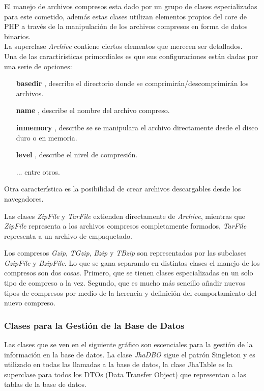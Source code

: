 El manejo de archivos compresos esta dado por un grupo de clases especializadas para este cometido, adem\'as estas clases utilizan elementos propios del core de PHP a trav\'es de la manipulaci\'on de los archivos compresos en forma de datos binarios.\\

La superclase \textit{Archive} contiene ciertos elementos que merecen ser detallados.\\

Una de las caractiristicas primordiales es que sus configuraciones est\'an dadas por una serie de opciones:
\begin{itemize}
	\item[\textbf{basedir}], describe el directorio donde se comprimir\'an/descomprimir\'an los archivos.
	\item[\textbf{name}], describe el nombre del archivo compreso.
	\item[\textbf{inmemory}], describe se se manipulara el archivo directamente desde el disco duro o en memoria.
	\item[\textbf{level}], describe el nivel de compresi\'on.
	\item[...] entre otros.
\end{itemize}



Otra caracter\'istica es la posibilidad de crear archivos descargables desde los navegadores.



Las clases \emph{ZipFile} y \emph{TarFile} extienden directamente de \emph{Archive}, mientras que \emph{ZipFile} representa a los archivos compresos completamente formados, \emph{TarFile} representa a un archivo de empaquetado.





Los compresos \emph{Gzip}, \emph{TGzip}, \emph{Bzip} y \emph{TBzip} son representados por las subclases \emph{GzipFile} y \emph{BzipFile}. Lo que se gana separando en distintas clases el manejo de los compresos son dos cosas. Primero, que se tienen clases especializadas en un solo tipo de compreso a la vez. Segundo, que es mucho m\'as sencillo a\~nadir nuevos tipos de compresos por medio de la herencia y definici\'on del comportamiento del nuevo compreso.

\subsubsection{Clases para la Gesti\'on de la Base de Datos}
Las clases que se ven en el siguiente gr\'afico son escenciales para la gesti\'on de la informaci\'on en la base de datos. La clase \textit{JhaDBO} sigue el patr\'on Singleton y es utilizado en todas las llamadas a la base de datos, la clase JhaTable es la superclase para todos los DTOs (Data Transfer Object) que representan a las tablas de la base de datos.\\

